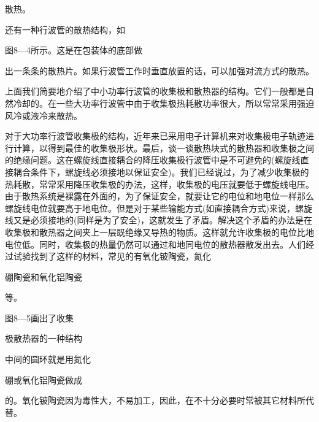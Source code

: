 散热。


还有一种行波管的散热结构，如


图8—4所示。这是在包装体的底部做


出一条条的散热片。如果行波管工作时垂直放置的话，可以加强对流方式的散热。


上面我们简要地介绍了中小功率行波管的收集极和散热器的结构。它们一般都是自然冷却的。在一些大功率行波管中由于收集极热耗散功率很大，所以常常采用强迫风冷或液冷来散热。



对于大功率行波管收集极的结构，近年来已采用电子计算机来对收集极电子轨迹进行计算，以得到最佳的收集极形状。最后，谈一谈散热块式的散热器和收集极之间的绝缘问题。这在螺旋线直接耦合的降压收集极行波管中是不可避免的(螺旋线直接耦合条件下，螺旋线必须接地以保证安全)。我们已经说过，为了减少收集极的热耗散，常常采用降压收集极的办法，这样，收集极的电压就要低于螺旋线电压。由于散热系统是裸露在外面的，为了保证安全，就要让它的电位和地电位一样那么螺旋线电位就要高于地电位。但是对于某些输能方式(如直接耦合方式)来说，螺旋线又是必须接地的(同样是为了安全)，这就发生了矛盾。解决这个矛盾的办法是在收集极和散热器之间夹上一层既绝缘又导热的物质。这样就允许收集极的电位比地电位低。同时，收集极的热量仍然可以通过和地同电位的散热器散发出去。人们经过试验找到了这样的材料，常见的有氧化铍陶瓷，氮化


硼陶瓷和氧化铝陶瓷


等。


图8—5画出了收集


极散热器的一种结构


中间的圆环就是用氮化


硼或氧化铝陶瓷做成


的。氧化铍陶瓷因为毒性大，不易加工，因此，在不十分必要时常被其它材料所代替。